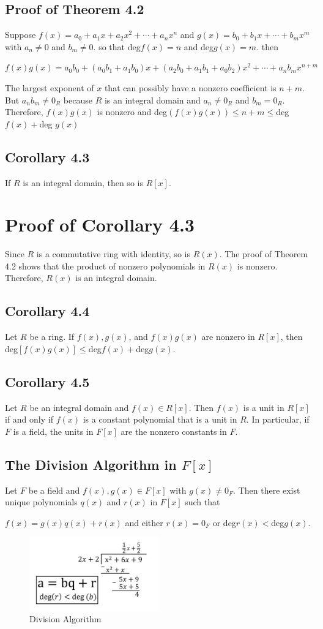 \documentclass{article}
\begin{document}
\subsection*{Proof of Theorem 4.2}
Suppose $f(x)=a_0+a_1x+a_2x^2+\cdots+a_nx^n$ and $g(x)=b_0 + b_1x+\cdots+b_mx^m$
with $a_n \neq 0$ and $b_m \neq 0$. so that deg$f(x) = n$ and deg$g(x) = m$. then
\begin{center}
    $f(x)g(x)=a_0b_0+(a_0b_1+a_1b_0)x+(a_2b_0+a_1b_1+a_0b_2)x^2+\cdots+a_nb_mx^{n+m}$
\end{center}
The largest exponent of $x$ that can possibly have a nonzero coefficient is
$n + m$. But $a_n b_m \neq 0_R$ because $R$ is an integral domain and $a_n \neq 0_R$ and
$b_m = 0_R$. Therefore, $f(x)g(x)$ is nonzero and deg$(f(x)g(x)) \leq n + m \leq $deg$f(x) + $deg $g(x)$

\subsection*{Corollary 4.3}
If $R$ is an integral domain, then so is $R[x]$.

\section*{Proof of Corollary 4.3}
Since $R$ is a commutative ring with identity, so is $R(x)$.
The proof of Theorem 4.2 shows that the product of nonzero polynomials
in $R(x)$ is nonzero. Therefore, $R(x)$ is an integral domain.

\subsection*{Corollary 4.4}
Let $R$ be a ring. If $f(x), g(x)$, and $f(x)g(x)$ are nonzero in $R[x]$,
then deg$[f(x)g(x)] \leq $deg$f(x) + $deg$g(x)$.

\subsection*{Corollary 4.5}
Let $R$ be an integral domain and $f(x) \in R[x]$. Then $f(x)$ is a unit in $R[x]$ if and only if $f(x)$ is a constant polynomial
that is a unit in $R$. In particular, if $F$ is a field, the units in $F[x]$ are the nonzero constants in $F$.
\vspace*{5cm}
\subsection*{The Division Algorithm in $F[x]$}
Let $F$ be a field and $f(x), g(x) \in F[x]$ with $g(x) \neq 0_F$. Then there exist unique polynomials $q(x)$ and $r(x)$ in $F[x]$ such that
\begin{center}
    $f(x) = g(x)q(x) + r(x)$ and either $r(x) = 0_F$ or deg$r(x) < $deg$g(x)$.
\end{center}

\begin{figure}
    \centering
    \includegraphics[width=0.5\textwidth]{divisonAlgorithm.jpg}
    \caption{Division Algorithm}
    \label{fig:division_algorithm}
\end{figure}
\end{document}

